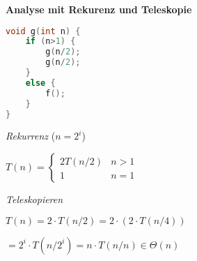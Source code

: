 \begin{sectionbox}
\textbf{Analyse mit Rekurenz und Teleskopie}\par\vspace{-4px}
\begin{lstlisting}[language=c++]
void g(int n) {
    if (n>1) {
        g(n/2);
        g(n/2);
    }
    else {
        f();
    }
}
\end{lstlisting}\vspace{-4px}
\textit{Rekurrenz} ($n=2^{i}$)\par
$T(n)=\left\{\begin{array}{ll}2 T(n / 2) & n>1 \\ 1 & n=1\end{array}\right.$\par\smallskip
\textit{Teleskopieren}\par
$T(n)=2 \cdot T(n / 2) = 2 \cdot (2 \cdot T(n / 4)) $ \par
$= 2^{i} \cdot T(n/2^{i}) = n \cdot T(n/n) \in \Theta(n)$\par\smallskip

\end{sectionbox}